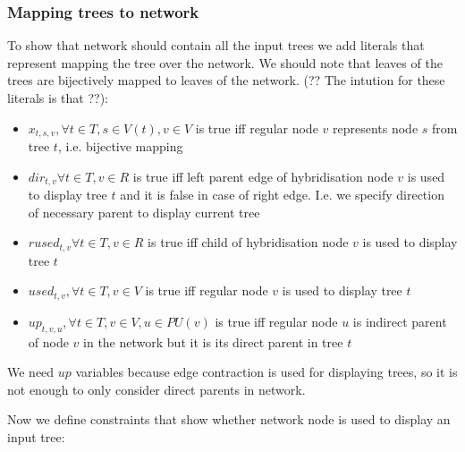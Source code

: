 \documentclass[runningheads, envcountsame, a4paper]{llncs}
\begin{document}
\subsubsection{Mapping trees to network}

To show that network should contain all the input trees we add literals that represent mapping the tree over the network. We should note that leaves of the trees are bijectively mapped to leaves of the network. (?? The intution for these literals is that ??):

\begin{itemize}

\item $x_{t,s,v}, \forall t \in T, s \in V(t), v \in V$ is true iff regular node $v$ represents node $s$ from tree $t$, i.e. bijective mapping

\item $dir_{t,v} \forall t \in T, v \in R$ is true iff left parent edge of hybridisation node $v$ is used to display tree $t$ and it is false in case of right edge. I.e. we specify direction of necessary parent to display current tree

\item $rused_{t,v} \forall t \in T, v \in R$ is true iff child of hybridisation node $v$ is used to display tree $t$

\item $used_{t,v}, \forall t \in T, v \in V$ is true iff regular node $v$ is used to display tree $t$

\item $up_{t,v,u}, \forall t \in T, v \in V, u \in PU(v)$ is true iff regular node $u$ is indirect parent of node $v$ in the network but it is its direct parent in tree $t$

\end{itemize}

We need $up$ variables because edge contraction is used for displaying trees, so it is not enough to only consider direct parents in network.

Now we define constraints that show whether network node is used to display an input tree:
\end{document}

